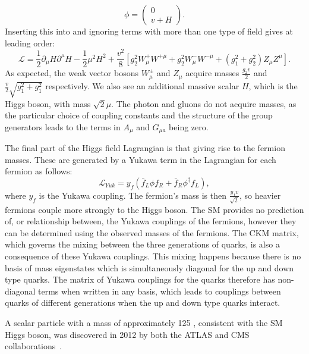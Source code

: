 \begin{equation}
  \phi=\left(\begin{array}{c}0 \\ v+H \end{array}\right).
\end{equation}
Inserting this into  and ignoring terms with more than one type of field gives at leading order:
\begin{equation}
  \mathcal{L}=\frac{1}{2}\partial_{\mu}H\partial^{\mu}H-\frac{1}{2}\mu^{2}H^{2}+\frac{v^{2}}{8}\left[g_{2}^{2}W_{\mu}^{+}W^{+\mu}+g_{2}^{2}W_{\mu}^{-}W^{-\mu}+\left(g_{1}^{2}+g_{2}^{2}\right)Z_{\mu}Z^{\mu}\right].
\end{equation}
As expected, the weak vector bosons $W_{\mu}^{\pm}$ and $Z_{\mu}$ acquire masses $\frac{g_{2}v}{2}$ and $\frac{v}{2}\sqrt{g_{1}^{2}+g_{1}^{2}}$ respectively. We also see an additional massive scalar $H$, which is the Higgs boson, with mass $\sqrt{2}\mu$. The photon and gluons do not acquire masses, as the particular choice of coupling constants and the structure of the group generators leads to the terms in $A_{\mu}$ and $G_{\mu a}$ being zero.

The final part of the Higgs field Lagrangian is that giving rise to the fermion masses. These are generated by a Yukawa term in the Lagrangian for each fermion as follows:
\begin{equation}
  \mathcal{L}_{Yuk}=y_{f}\left(\bar{f}_{L}\phi f_{R}+\bar{f}_{R}\phi^{\dag}f_{L}\right),
\end{equation}
where $y_{f}$ is the Yukawa coupling. The fermion's mass is then $\frac{y_{f}v}{\sqrt{2}}$, so heavier fermions couple more strongly to the Higgs boson. The \ac{SM} provides no prediction of, or relationship between, the Yukawa couplings of the fermions, however they can be determined using the observed masses of the fermions. The CKM matrix, which governs the mixing between the three generations of quarks, is also a consequence of these Yukawa couplings. This mixing happens because there is no basis of mass eigenstates which is simultaneously diagonal for the up and down type quarks. The matrix of Yukawa couplings for the quarks therefore has non-diagonal terms when written in any basis, which leads to couplings between quarks of different generations when the up and down type quarks interact.

A scalar particle with a mass of approximately 125 \GeV, consistent with the \ac{SM} Higgs boson, was discovered in 2012 by both the ATLAS and CMS collaborations~\cite{Aad20121,Chatrchyan201230}.


